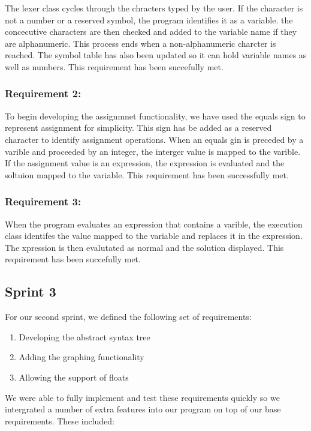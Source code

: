 \documentclass[a4paper, oneside, 11pt]{report}
\begin{document}
The lexer class cycles through the chracters typed by the user. If the character is not a number or a reserved symbol, the program identifies it as a variable. the concecutive characters are then checked and added to the variable name if they are alphanumeric. This process ends when a non-alphanumeric charcter is reached.
The symbol table has also been updated so it can hold variable names as well as numbers.
This requirement has been succefully met.

\subsubsection{Requirement 2: }

To begin developing the assignmnet functionality, we have used the equals sign to represent assignment for simplicity. This sign has be added as a reserved character to identify assignment operations. When an equals gin is preceded by a varible and proceeded by an integer, the interger value is mapped to the varible. If the assignment value is an expression, the expression is evaluated and the soltuion mapped to the variable.
This requirement has been successfully met.

\subsubsection{Requirement 3: }

When the program evaluates an expression that contains a varible, the execution class identifes the value mapped to the variable and replaces it in the expression. The xpression is then evalutated as normal and the solution displayed.
This requirement has been succefully met.

\subsection{Sprint 3}

For our second sprint, we defined the following set of requirements: 

\begin{enumerate}
\item Developing the abstract syntax tree
\item Adding the graphing functionality
\item Allowing the support of floats
\end{enumerate}

 We were able to fully implement and test these requirements quickly so we intergrated a number of extra features into our program on top of our base requirements. These included:
\end{document}
